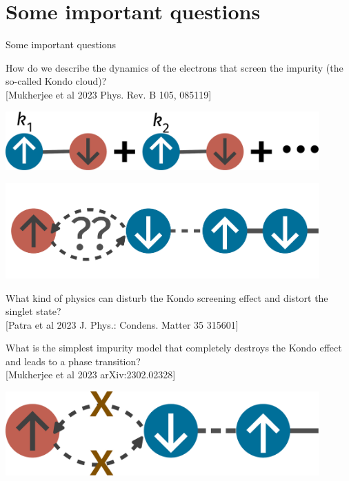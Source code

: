 \documentclass[aspectratio=169]{beamer}
\begin{document}
\section{Some important questions}
\begin{frame}{Some important questions}
\begin{minipage}{0.45\textwidth}
	How do we describe the dynamics of the electrons that screen the impurity (the so-called \alert{Kondo cloud})?\\
	\footnotesize{[Mukherjee et al 2023 Phys. Rev. B 105, 085119]}
\end{minipage}
\hspace*{\fill}
\begin{minipage}{0.45\textwidth}
	\includegraphics[width=0.9\textwidth]{kondocloud.pdf}
\end{minipage}
\vspace*{\fill}

\begin{minipage}{0.45\textwidth}
	\includegraphics[width=0.9\textwidth]{distortsinglet.pdf}
\end{minipage}
\hspace*{\fill}
\begin{minipage}{0.45\textwidth}
	What kind of physics can \alert{disturb the Kondo screening} effect and distort the singlet state?\\
	\footnotesize{[Patra et al 2023 J. Phys.: Condens. Matter 35 315601]}
\end{minipage}
\vspace*{\fill}

\begin{minipage}{0.45\textwidth}
	What is the simplest impurity model that completely destroys the Kondo effect and leads to a \alert{phase transition}?\\
	\footnotesize{[Mukherjee et al 2023 arXiv:2302.02328]}
\end{minipage}
\hspace*{\fill}
\begin{minipage}{0.45\textwidth}
	\includegraphics[width=0.9\textwidth]{kondobreakdown.pdf}
\end{minipage}
\end{frame}
\end{document}
